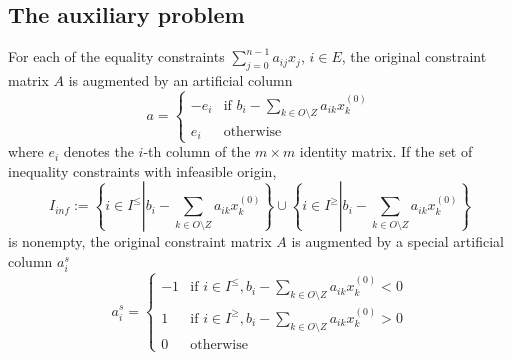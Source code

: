 \documentclass[a4paper]{article}
\begin{document}
\subsection{The auxiliary problem}
For each of the equality constraints $\sum_{j=0}^{n-1}a_{ij}x_{j}$, $i \in E$,
the original constraint matrix $A$ is augmented by an artificial column 
\begin{equation}
a= \left\{
\begin{array}{ll}
-e_{i}
&
\mbox{if $b_{i}-\sum_{k \in O \setminus Z}a_{ik}x_{k}^{(0)}$} \\
e_{i}
&
\mbox{otherwise}
\end{array}
\right.
\end{equation}
where $e_{i}$ denotes the $i$-th column of the $m \times m$ identity matrix. If the set of inequality constraints with infeasible origin, 
\begin{equation}
I_{inf}:=\left\{
  i \in I^{\leq}\left|\right. b_{i}-\sum_{k \in O \setminus Z}a_{ik}x_{k}^{(0)}
  \right\}
  \cup
  \left\{
    i \in I^{\geq} \left|\right. b_{i}-\sum_{k \in O \setminus Z}a_{ik}
    x_{k}^{(0)}
  \right\}
\end{equation}
is nonempty, the original constraint matrix $A$ is augmented by a special artificial column $a_{i}^{s}$
\begin{equation}
a_{i}^{s}= \left\{
\begin{array}{ll}
-1
&
\mbox{if $i \in I^{\leq}, b_{i}-\sum_{k \in O \setminus Z}a_{ik}
    x_{k}^{(0)}<0$} \\
1
&
\mbox{if $i \in I^{\geq}, b_{i}-\sum_{k \in O \setminus Z}a_{ik}
   x_{k}^{(0)}>0$} \\
0
&
\mbox{otherwise}
\end{array}
\right.
\end{equation}
\end{document}

